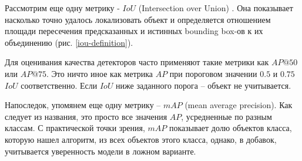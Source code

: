 
Рассмотрим еще одну метрику - $IoU$ (Intersection over Union) \cite{lib-iou-metric}. Она показывает насколько точно удалось локализовать объект и определяется отношением площади пересечения предсказанных и истинных bounding box-ов к их объединению (рис. \ref{iou-definition}). 


Для оценивания качества детекторов часто применяют такие метрики как $AP@50$ или $AP@75$. Это ничто иное как метрика $AP$ при пороговом значении $0.5$ и $0.75$ $IoU$ соответственно. Если $IoU$ ниже заданного порога -- объект не учитывается. 

Напоследок, упомянем еще одну метрику -- $mAP$ (mean average precision). Как следует из названия, это просто все значения $AP$, усредненные по разным классам. С практической точки зрения, $mAP$ показывает долю объектов класса, которую нашел алгоритм, из всех объектов этого класса, однако, в добавок, учитывается уверенность модели в ложном варианте.